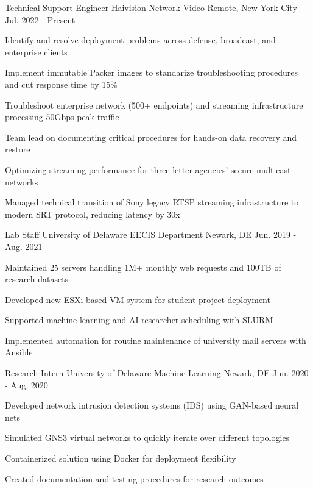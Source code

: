 \documentclass[11pt, letterpaper]{awesome-cv}
\begin{document}
\begin{cventries}

  \cventry
    {Technical Support Engineer} %
    {Haivision Network Video} %
    {Remote, New York City} %
    {Jul. 2022 - Present} %
    {
      \begin{cvitems} %
        \item {Identify and resolve deployment problems across defense, broadcast, and enterprise clients}
        \item {Implement immutable Packer images to standarize troubleshooting procedures and cut response time by 15\%}
        \item {Troubleshoot enterprise network (500+ endpoints) and streaming infrastructure processing 50Gbps peak traffic}
        \item {Team lead on documenting critical procedures for hands-on data recovery and restore}
        \item {Optimizing streaming performance for three letter agencies' secure multicast networks}
        \item {Managed technical transition of Sony legacy RTSP streaming infrastructure to modern SRT protocol, reducing latency by 30x}
      \end{cvitems}
    }

\vspace{0.5cm}
  \cventry
    {Lab Staff}
    {University of Delaware EECIS Department}
    {Newark, DE}
    {Jun. 2019 - Aug. 2021}
    {
      \begin{cvitems}
        \item {Maintained 25 servers handling 1M+ monthly web requests and 100TB of research datasets}
        \item {Developed new ESXi based VM system for student project deployment}
        \item {Supported machine learning and AI researcher scheduling with SLURM}
        \item {Implemented automation for routine maintenance of university mail servers with Ansible}
      \end{cvitems}
    }

\vspace{0.5cm}
  \cventry
    {Research Intern}
    {University of Delaware Machine Learning}
    {Newark, DE}
    {Jun. 2020 - Aug. 2020}
    {
      \begin{cvitems}
        \item {Developed network intrusion detection systems (IDS) using GAN-based neural nets}
        \item {Simulated GNS3 virtual networks to quickly iterate over different topologies}
        \item {Containerized solution using Docker for deployment flexibility}
        \item {Created documentation and testing procedures for research outcomes}
      \end{cvitems}
    }


\end{cventries}
\end{document}
